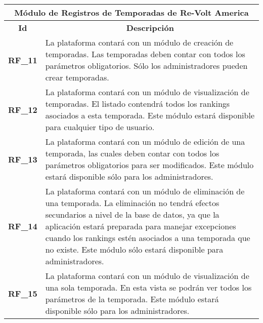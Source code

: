\begin{center}
	\begin{tabular}{ | l | p{15cm} |}
		\hline
		\multicolumn{2}{|c|}{\textbf{Módulo de Registros de Temporadas de Re-Volt America}} \\
		\hline
		\multicolumn{1}{|c|}{\textbf{Id}} & \multicolumn{1}{|c|}{\textbf{Descripción}} \\
		\hline
		{\textbf{RF\_11}} & La plataforma contará con un módulo de creación de temporadas. Las temporadas deben contar con todos los parámetros obligatorios. Sólo los administradores pueden crear temporadas. \\ \hline
		
		{\textbf{RF\_12}} & La plataforma contará con un módulo de visualización de temporadas. El listado contendrá todos los rankings asociados a esta temporada. Este módulo estará disponible para cualquier tipo de usuario. \\ \hline
		
		{\textbf{RF\_13}} & La plataforma contará con un módulo de edición de una temporada, las cuales deben contar con todos los parámetros obligatorios para ser modificados. Este módulo estará disponible sólo para los administradores. \\ \hline
		
		{\textbf{RF\_14}} & La plataforma contará con un módulo de eliminación de una temporada. La eliminación no tendrá efectos secundarios a nivel de la base de datos, ya que la aplicación estará preparada para manejar excepciones cuando los rankings estén asociados a una temporada que no existe. Este módulo sólo estará disponible para administradores. \\ \hline
		
		{\textbf{RF\_15}} & La plataforma contará con un módulo de visualización de una sola temporada. En esta vista se podrán ver todos los parámetros de la temporada. Este módulo estará disponible sólo para los administradores. \\ \hline
	\end{tabular}
\end{center}

